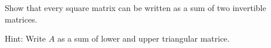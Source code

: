
\begin{Exercise}[
name={},
title={}, 
difficulty=0,
origin={\cite{BS}}]
Show that every square matrix can be written as a sum of two invertible matrices.
\end{Exercise}

\begin{Answer}
Hint: Write $A$ as a sum of lower and upper triangular matrice.
\end{Answer}
